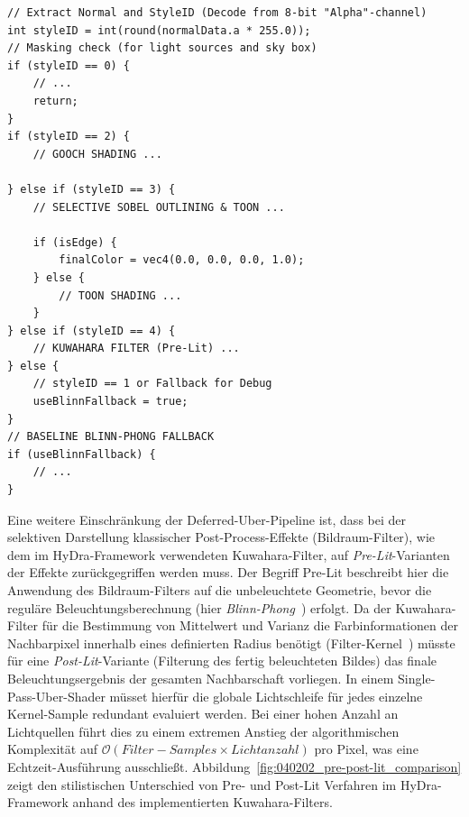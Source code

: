 \begin{listing}[htbp]
    \begin{codeframe}
        \begin{verbatim}
// Extract Normal and StyleID (Decode from 8-bit "Alpha"-channel)
int styleID = int(round(normalData.a * 255.0));
// Masking check (for light sources and sky box)
if (styleID == 0) {
    // ...
    return;
}
if (styleID == 2) {
    // GOOCH SHADING ...

} else if (styleID == 3) {
    // SELECTIVE SOBEL OUTLINING & TOON ...

    if (isEdge) {
        finalColor = vec4(0.0, 0.0, 0.0, 1.0);
    } else {
        // TOON SHADING ...
    }
} else if (styleID == 4) {
    // KUWAHARA FILTER (Pre-Lit) ...
} else {
    // styleID == 1 or Fallback for Debug
    useBlinnFallback = true;
}
// BASELINE BLINN-PHONG FALLBACK
if (useBlinnFallback) {
    // ...
}
        \end{verbatim}
    \end{codeframe}
    \caption[GLSL-Code des Deferred-Uber Beleuchtungspasses im HyDra-Framework]
    {GLSL-Code des Deferred-Uber Beleuchtungspasses im HyDra-Framework}
    \label{lst:deferred_branching_structure}
\end{listing}

Eine weitere Einschränkung der Deferred-Uber-Pipeline ist, dass bei der selektiven Darstellung klassischer
Post-Process-Effekte (Bildraum-Filter), wie dem im \ac{HyDra}-Framework verwendeten Kuwahara-Filter, auf
\textit{Pre-Lit}-Varianten der Effekte zurückgegriffen werden muss.
Der Begriff Pre-Lit beschreibt hier die Anwendung des Bildraum-Filters auf die unbeleuchtete Geometrie, bevor die
reguläre Beleuchtungsberechnung (hier \textit{Blinn-Phong}~\parencite[vgl.][Kap.~11.1.3.2]{gregoryGameEngineArchitecture2018})
erfolgt.
Da der Kuwahara-Filter für die Bestimmung von Mittelwert und Varianz die Farbinformationen der Nachbarpixel innerhalb
eines definierten Radius benötigt (Filter-Kernel~\parencite[vgl.][Abschn.~2]{kyprianidisImageVideoAbstraction2009}) müsste für
eine \textit{Post-Lit}-Variante (Filterung des fertig beleuchteten Bildes) das finale Beleuchtungsergebnis der gesamten
Nachbarschaft vorliegen.
In einem Single-Pass-Uber-Shader müsset hierfür die globale Lichtschleife für jedes einzelne Kernel-Sample
redundant evaluiert werden.
Bei einer hohen Anzahl an Lichtquellen führt dies zu einem extremen Anstieg der algorithmischen Komplexität auf
$\mathcal{O}(Filter-Samples \times Lichtanzahl)$ pro Pixel, was eine Echtzeit-Ausführung ausschließt.
Abbildung~\ref{fig:040202_pre-post-lit_comparison} zeigt den stilistischen Unterschied von Pre- und Post-Lit Verfahren
im \ac{HyDra}-Framework anhand des implementierten Kuwahara-Filters.

